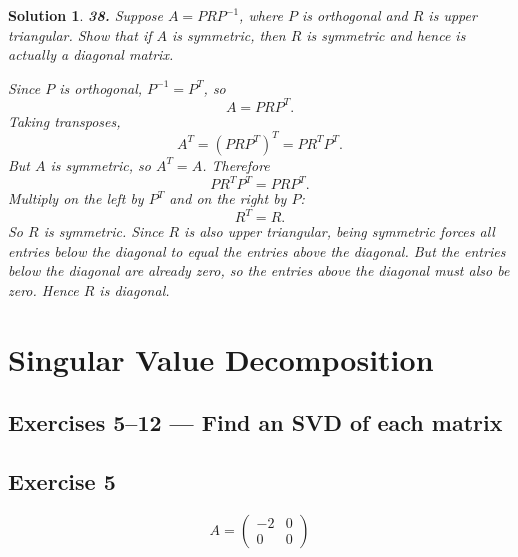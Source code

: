 \documentclass[11pt,a4paper]{article}
\theoremstyle{sol}
\newtheorem*{solution}{Solution}
\begin{document}
\begin{solution}
\medskip
\textbf{38.} \emph{Suppose $A=PRP^{-1}$, where $P$ is orthogonal and $R$ is upper triangular. Show that if $A$ is symmetric, then $R$ is symmetric and hence is actually a diagonal matrix.}

Since $P$ is orthogonal, $P^{-1}=P^T$, so
\[
A=PRP^T.
\]
Taking transposes,
\[
A^T=(PRP^T)^T=PR^TP^T.
\]
But $A$ is symmetric, so $A^T=A$. Therefore
\[
PR^TP^T=PRP^T.
\]
Multiply on the left by $P^T$ and on the right by $P$:
\[
R^T=R.
\]
So $R$ is symmetric. Since $R$ is also upper triangular, being symmetric forces all entries below the diagonal to equal the entries above the diagonal. But the entries below the diagonal are already zero, so the entries above the diagonal must also be zero. Hence $R$ is diagonal.
\end{solution}

\clearpage
\section{Singular Value Decomposition}

\subsection*{Exercises 5--12 --- Find an SVD of each matrix}

\subsection*{Exercise 5}
\[
A=\begin{pmatrix}-2&0\\0&0\end{pmatrix}
\]
\end{document}
